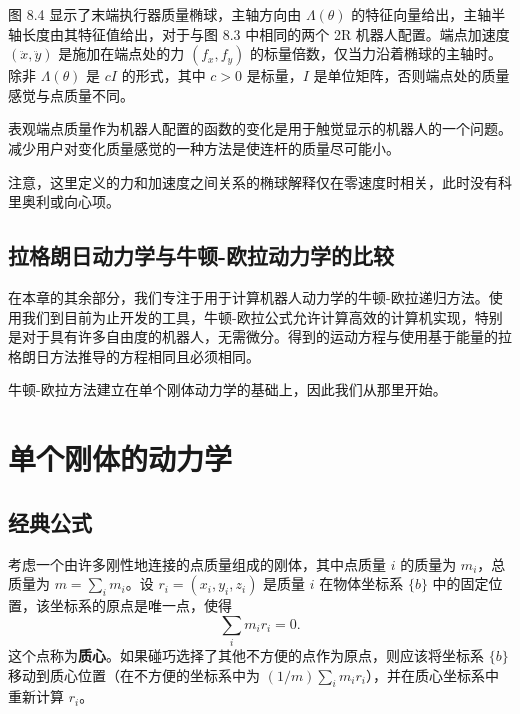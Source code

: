 \documentclass[12pt,a4paper]{article}
\begin{document}
图 8.4 显示了末端执行器质量椭球，主轴方向由 $\Lambda(\theta)$ 的特征向量给出，主轴半轴长度由其特征值给出，对于与图 8.3 中相同的两个 2R 机器人配置。端点加速度 $(\ddot{x}, \ddot{y})$ 是施加在端点处的力 $(f_x, f_y)$ 的标量倍数，仅当力沿着椭球的主轴时。除非 $\Lambda(\theta)$ 是 $cI$ 的形式，其中 $c > 0$ 是标量，$I$ 是单位矩阵，否则端点处的质量感觉与点质量不同。

表观端点质量作为机器人配置的函数的变化是用于触觉显示的机器人的一个问题。减少用户对变化质量感觉的一种方法是使连杆的质量尽可能小。

注意，这里定义的力和加速度之间关系的椭球解释仅在零速度时相关，此时没有科里奥利或向心项。

\subsection{拉格朗日动力学与牛顿-欧拉动力学的比较}

在本章的其余部分，我们专注于用于计算机器人动力学的牛顿-欧拉递归方法。使用我们到目前为止开发的工具，牛顿-欧拉公式允许计算高效的计算机实现，特别是对于具有许多自由度的机器人，无需微分。得到的运动方程与使用基于能量的拉格朗日方法推导的方程相同且必须相同。

牛顿-欧拉方法建立在单个刚体动力学的基础上，因此我们从那里开始。

\section{单个刚体的动力学}
\subsection{经典公式}

考虑一个由许多刚性地连接的点质量组成的刚体，其中点质量 $i$ 的质量为 $m_i$，总质量为 $m = \sum_i m_i$。设 $r_i = (x_i, y_i, z_i)$ 是质量 $i$ 在物体坐标系 $\{b\}$ 中的固定位置，该坐标系的原点是唯一点，使得
\begin{equation}
\sum_i m_i r_i = 0.
\end{equation}
这个点称为\textbf{质心}。如果碰巧选择了其他不方便的点作为原点，则应该将坐标系 $\{b\}$ 移动到质心位置（在不方便的坐标系中为 $(1/m)\sum_i m_i r_i$），并在质心坐标系中重新计算 $r_i$。
\end{document}
